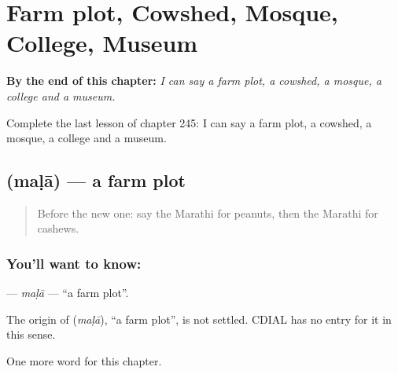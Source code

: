 
\chapter{Farm plot, Cowshed, Mosque, College, Museum}
\label{ch:mr-farm-plot-cowshed-mosque-college-museum}

\begin{chapteropening}
\textbf{By the end of this chapter:} \emph{I can say a farm plot, a cowshed, a mosque, a college and a museum.}

Complete the last lesson of chapter 245: I can say a farm plot, a cowshed, a mosque, a college and a museum.
\end{chapteropening}

\section[\texorpdfstring{\mr{मळा} (maḷā)}{मळा (maḷā)}]{ (maḷā) — a farm plot}

\label{lesson:MR-C245-mala2}



\begin{quote}
Before the new one: say the Marathi for peanuts, then the Marathi for cashews.
\end{quote}

\subsection*{You'll want to know: }
\textbf{} — \emph{maḷā} — \textquotedblleft{}a farm plot\textquotedblright{}.

\begin{cousinweb}
The origin of \textbf{} (\emph{maḷā}), \textquotedblleft{}a farm plot\textquotedblright{}, is not settled. CDIAL has no entry for it in this sense.
\end{cousinweb}

\begin{grammarlens}[title={What you've built}]
One more word for this chapter.
\end{grammarlens}

